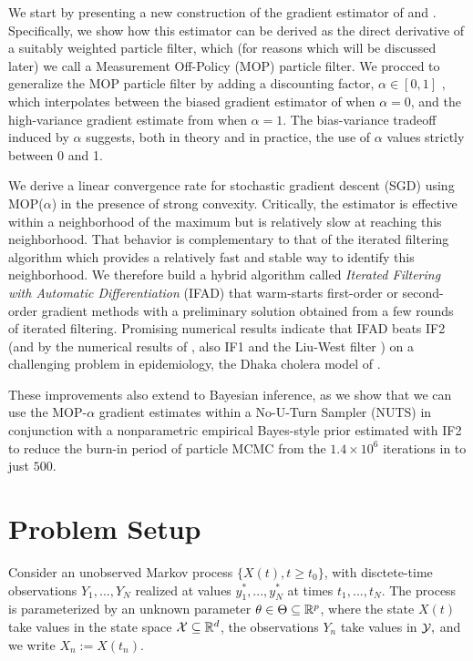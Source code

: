 \documentclass[9pt,twocolumn,twoside]{pnas-new}
\begin{document}
We start by presenting a new construction of the gradient estimator of \cite{scibior21} and \cite{poyiadjis11}.
Specifically, we show how this estimator can be derived as the direct derivative of a suitably weighted particle filter, which (for reasons which will be discussed later) we call a Measurement Off-Policy (MOP) particle filter.
We procced to generalize the MOP particle filter by adding a discounting factor, $\alpha \in [0,1]$ , which interpolates between the  biased gradient estimator of \cite{naesseth18} when $\alpha=0$, and the high-variance gradient estimate from \cite{poyiadjis11, scibior21} when $\alpha=1$.
The bias-variance tradeoff induced by $\alpha$ suggests, both in theory and in practice, the use of $\alpha$ values strictly between 0 and 1.

We derive a linear convergence rate for stochastic gradient descent (SGD) using MOP($\alpha$) in the  presence of strong convexity.
Critically, the estimator is effective within a neighborhood of the maximum but is relatively slow at reaching this neighborhood.
That behavior is complementary to that of the iterated filtering algorithm \cite{ionides06-pnas,ionides15} which provides a relatively fast and stable way to identify this neighborhood.
We therefore build a hybrid algorithm called {\it Iterated Filtering with Automatic Differentiation} (IFAD) that warm-starts first-order or second-order gradient methods with a preliminary solution obtained from a few rounds of iterated filtering.
Promising numerical results indicate that IFAD beats IF2 (and by the numerical results of \cite{ionides15}, also IF1 and the Liu-West filter \cite{liuwest01}) on a challenging problem in epidemiology, the Dhaka cholera model of \cite{king08}.

These improvements also extend to Bayesian inference, as we show that we can use the MOP-$\alpha$ gradient estimates within a No-U-Turn Sampler (NUTS) \cite{homan14} in conjunction with a nonparametric empirical Bayes-style prior estimated with IF2 to reduce the burn-in period of particle MCMC \cite{andrieu10} from the $1.4 \times 10^6$ iterations in \cite{fasiolo16} to just $500$. 

\section{Problem Setup}

Consider an unobserved Markov process $\{X(t),t  \geq t_0\}$, with disctete-time observations $Y_1,...,Y_N$ realized at values $y_1^*,...,y_N^*$ at times $t_1,..., t_N$.
The process is parameterized by an unknown parameter $\theta \in \Theta \subseteq \mathbb{R}^p$, where the state $X(t)$ take values in the state space ${\mathcal{X}} \subseteq \mathbb{R}^d$, the observations $Y_n$ take values in ${\mathcal{Y}},$ and we write $X_n := X(t_n)$. 
\end{document}
